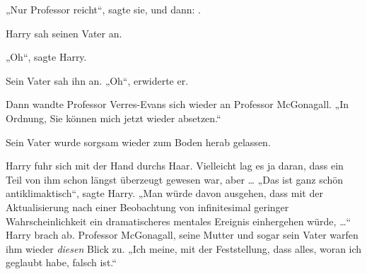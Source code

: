 „Nur Professor reicht“, sagte sie, und dann: .

Harry sah seinen Vater an.

„Oh“, sagte Harry.

Sein Vater sah ihn an.
„Oh“, erwiderte er.

Dann wandte Professor Verres-Evans sich wieder an Professor McGonagall.
„In Ordnung, Sie können mich jetzt wieder absetzen.“

Sein Vater wurde sorgsam wieder zum Boden herab gelassen.

Harry fuhr sich mit der Hand durchs Haar. Vielleicht lag es ja daran, dass ein Teil von ihm schon längst überzeugt gewesen war, aber …
„Das ist ganz schön antiklimaktisch“, sagte Harry.
„Man würde davon ausgehen, dass mit der Aktualisierung nach einer Beobachtung von infinitesimal geringer Wahrscheinlichkeit ein dramatischeres mentales Ereignis einhergehen würde, …“ Harry brach ab. Professor McGonagall, seine Mutter und sogar sein Vater warfen ihm wieder \emph{diesen} Blick zu.
„Ich meine, mit der Feststellung, dass alles, woran ich geglaubt habe, falsch ist.“

